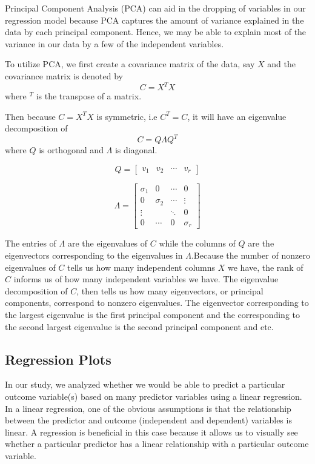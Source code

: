 \documentclass[12pt, letterpaper]{article}
\begin{document}
Principal Component Analysis (PCA) can aid in the dropping of variables in our regression model because PCA captures the amount of variance explained in the data by each principal component. Hence, we may be able to explain most of the variance in our data by a few of the independent variables.

To utilize PCA, we first create a covariance matrix of the data, say $X$ and the covariance matrix is denoted by $$C = X^TX$$ where $^T$ is the transpose of a matrix. 

Then because $C = X^TX$ is symmetric, i.e $C^T = C$, it will have an eigenvalue decomposition of $$C = Q\Lambda Q^T$$ where $Q$ is orthogonal and $\Lambda$ is diagonal. 

$$Q = \begin{bmatrix} v_1 & v_2 & \cdots & v_r \end{bmatrix}$$

$$\Lambda = \begin{bmatrix} \sigma_1 & 0 & \cdots & 0 \\ 0 & \sigma_2 & \cdots & \vdots \\ \vdots &  & \ddots & 0\\ 0 &\cdots & 0 & \sigma_r \end{bmatrix}$$

The entries of $\Lambda$ are the eigenvalues of $C$ while the columns of $Q$ are the eigenvectors corresponding to the eigenvalues in $\Lambda$.Because the number of nonzero eigenvalues of $C$ tells us how many independent columns $X$ we have, the rank of $C$ informs us of how many independent variables we have. The eigenvalue decomposition of $C$, then tells us how many eigenvectors, or principal components, correspond to nonzero eigenvalues. The eigenvector corresponding to the largest eigenvalue is the first principal component and the corresponding to the second largest eigenvalue is the second principal component and etc. 

\subsection{Regression Plots}
In our study, we analyzed whether we would be able to predict a particular outcome variable(s) based on many predictor variables using a linear regression. In a linear regression, one of the obvious assumptions is that the relationship between the predictor and outcome (independent and dependent) variables is linear. A regression is beneficial in this case because it allows us to visually see whether a particular predictor has a linear relationship with a particular outcome variable. 
\end{document}
